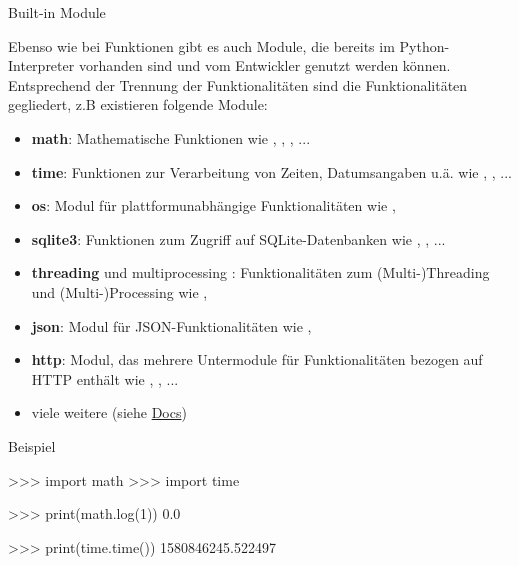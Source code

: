     \begin{frame}{Built-in Module}
    
        Ebenso wie bei Funktionen gibt es auch Module, die bereits im Python-Interpreter vorhanden sind und vom Entwickler genutzt werden können. Entsprechend der Trennung der Funktionalitäten sind die Funktionalitäten gegliedert, z.B existieren folgende Module:
        
        \begin{itemize}
            \item \textbf{math}: Mathematische Funktionen wie , , , ...
            \item \textbf{time}: Funktionen zur Verarbeitung von Zeiten, Datumsangaben u.ä. wie , , ...
            \item \textbf{os}: Modul für plattformunabhängige Funktionalitäten wie , 
            \item \textbf{sqlite3}: Funktionen zum Zugriff auf SQLite-Datenbanken wie , , ...
            \item \textbf{threading} und multiprocessing : Funktionalitäten zum (Multi-)Threading und (Multi-)Processing wie , 
            \item \textbf{json}: Modul für JSON-Funktionalitäten wie , 
            \item \textbf{http}: Modul, das mehrere Untermodule für Funktionalitäten bezogen auf HTTP enthält wie , , ...
            \item viele weitere (siehe \href{https://docs.python.org/3/library/}{Docs})
        \end{itemize}
        
        \begin{exampleblock}{Beispiel}
\begin{pyconcode}
>>> import math
>>> import time

>>> print(math.log(1))
0.0

>>> print(time.time())
1580846245.522497
\end{pyconcode}
        \end{exampleblock}
    \end{frame}
